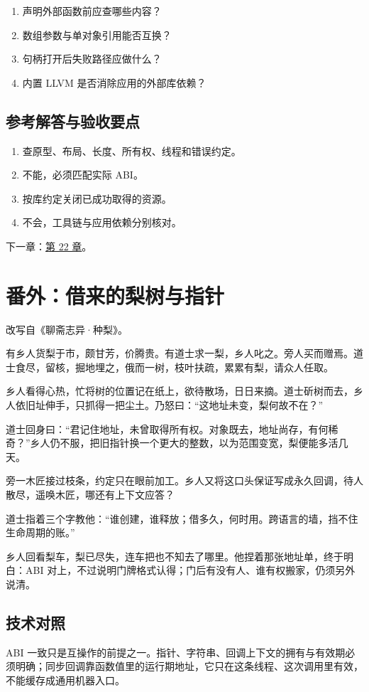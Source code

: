 \begin{enumerate}

\item 声明外部函数前应查哪些内容？

\item 数组参数与单对象引用能否互换？

\item 句柄打开后失败路径应做什么？

\item 内置 LLVM 是否消除应用的外部库依赖？

\end{enumerate}

\subsection*{参考解答与验收要点}

\begin{enumerate}

\item 查原型、布局、长度、所有权、线程和错误约定。

\item 不能，必须匹配实际 ABI。

\item 按库约定关闭已成功取得的资源。

\item 不会，工具链与应用依赖分别核对。

\end{enumerate}

下一章：\hyperref[ch:22]{第 22 章}。

\section{番外：借来的梨树与指针}

改写自《聊斋志异·种梨》。

有乡人货梨于市，颇甘芳，价腾贵。有道士求一梨，乡人叱之。旁人买而赠焉。道士食尽，留核，掘地埋之，俄而一树，枝叶扶疏，累累有梨，请众人任取。

乡人看得心热，忙将树的位置记在纸上，欲待散场，日日来摘。道士斫树而去，乡人依旧址伸手，只抓得一把尘土。乃怒曰：“这地址未变，梨何故不在？”

道士回身曰：“君记住地址，未曾取得所有权。对象既去，地址尚存，有何稀奇？”乡人仍不服，把旧指针换一个更大的整数，以为范围变宽，梨便能多活几天。

旁一木匠接过枝条，约定只在眼前加工。乡人又将这口头保证写成永久回调，待人散尽，遥唤木匠，哪还有上下文应答？

道士指着三个字教他：“谁创建，谁释放；借多久，何时用。跨语言的墙，挡不住生命周期的账。”

乡人回看梨车，梨已尽失，连车把也不知去了哪里。他捏着那张地址单，终于明白：ABI 对上，不过说明门牌格式认得；门后有没有人、谁有权搬家，仍须另外说清。

\subsection*{技术对照}

ABI 一致只是互操作的前提之一。指针、字符串、回调上下文的拥有与有效期必须明确；同步回调靠函数值里的运行期地址，它只在这条线程、这次调用里有效，不能缓存成通用机器入口。
